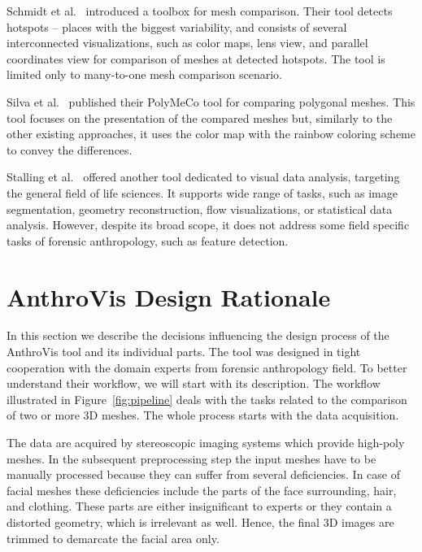 \documentclass[final,5p,times]{elsarticle}
\begin{document}
Schmidt et al.~\cite{ymca} introduced a toolbox for mesh comparison.
Their tool detects hotspots -- places with the biggest variability, and consists of several interconnected visualizations, such as color maps, lens view, and parallel coordinates view for comparison of meshes at detected hotspots.
The tool is limited only to many-to-one mesh comparison scenario.

Silva et al.~\cite{Silva2005} published their PolyMeCo tool for comparing polygonal meshes. 
This tool focuses on the presentation of the compared meshes but, similarly to the other existing approaches, it uses the color map with the rainbow coloring scheme to convey the differences.

Stalling et al.~\cite{stalling200538} offered another tool dedicated to visual data analysis, targeting the general field of life sciences. 
It supports wide range of tasks, such as image segmentation, geometry reconstruction, flow visualizations, or statistical data analysis.
However, despite its broad scope, it does not address some field specific tasks of forensic anthropology, such as feature detection.

\section{AnthroVis Design Rationale} \label{overview}
In this section we describe the decisions influencing the design process of the AnthroVis tool and its individual parts.
The tool was designed in tight cooperation with the domain experts from forensic anthropology field.
To better understand their workflow, we will start with its description.
The workflow illustrated in Figure~\ref{fig:pipeline} deals with the tasks related to the comparison of two or more 3D meshes.
The whole process starts with the data acquisition.

The data are acquired by stereoscopic imaging systems which provide high-poly meshes. 
In the subsequent preprocessing step the input meshes have to be manually processed because they can suffer from several deficiencies. 
In case of facial meshes these deficiencies include the parts of the face surrounding, hair, and clothing.
These parts are either insignificant to experts or they contain a distorted geometry, which is irrelevant as well. 
Hence, the final 3D images are trimmed to demarcate the facial area only.
\end{document}
